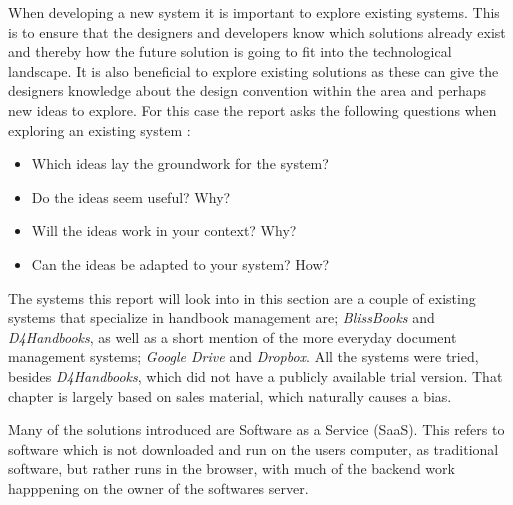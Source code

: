 When developing a new system it is important to explore existing systems.
This is to ensure that the designers and developers know which solutions already exist and thereby how the future solution is going to fit into the technological landscape.
It is also beneficial to explore existing solutions as these can give the designers knowledge about the design convention within the area and perhaps new ideas to explore.
For this case the report asks the following questions when exploring an existing system \citep[p.~33]{Rod-Aalborg}:

\begin{itemize}
  \item Which ideas lay the groundwork for the system?
  \item Do the ideas seem useful? Why?
  \item Will the ideas work in your context? Why?
  \item Can the ideas be adapted to your system? How?
\end{itemize}

The systems this report will look into in this section are a couple of existing systems that specialize in handbook management are; \textit{BlissBooks} and \textit{D4Handbooks}, as well as a short mention of the more everyday document management systems; \textit{Google Drive} and \textit{Dropbox}. All the systems were tried, besides \textit{D4Handbooks}, which did not have a publicly available trial version. That chapter is largely based on sales material, which naturally causes a bias.

Many of the solutions introduced are Software as a Service (SaaS). This refers to software which is not downloaded and run on the users computer, as traditional software, but rather runs in the browser, with much of the backend work happpening on the owner of the softwares server.
